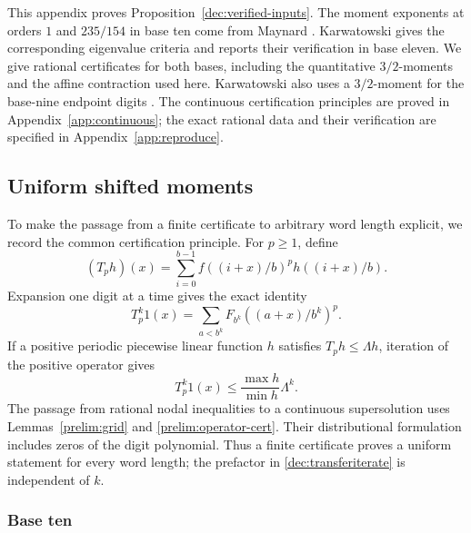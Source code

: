 \documentclass[11pt,a4paper]{article}
\theoremstyle{paperplain}
\numberwithin{equation}{section}
\begin{document}
This appendix proves Proposition~\ref{dec:verified-inputs}.
The moment exponents at orders $1$ and $235/154$ in base ten come
from Maynard \cite[Lemmas~10.3--10.4]{Maynard2019}. Karwatowski
\cite[Sections~3 and~5]{Karwatowski2022} gives the corresponding
eigenvalue criteria and reports their verification in base eleven. We give rational certificates for both bases, including
the quantitative $3/2$-moments and the affine contraction used here.
Karwatowski also uses a $3/2$-moment for the base-nine endpoint digits
\cite[Section~3, p.~5]{KarwatowskiBaseNine}. The continuous
certification principles are proved in Appendix~\ref{app:continuous};
the exact rational data and their verification are specified in
Appendix~\ref{app:reproduce}.

\subsection{Uniform shifted moments}

To make the passage from a finite certificate to arbitrary word length explicit,
we record the common certification principle. For $p\ge1$, define
\[
 (T_ph)(x)=\sum_{i=0}^{b-1}f((i+x)/b)^p h((i+x)/b).
\]
Expansion one digit at a time gives the exact identity
\[
 T_p^k1(x)=\sum_{a<b^k}F_{b^k}((a+x)/b^k)^p.
\]
If a positive periodic piecewise linear function $h$ satisfies
$T_ph\le\Lambda h$, iteration of the positive operator gives
\begin{equation}\label{dec:transferiterate}
 T_p^k1(x)\le \frac{\max h}{\min h}\Lambda^k.
\end{equation}
The passage from rational nodal inequalities to a continuous supersolution
uses Lemmas~\ref{prelim:grid} and \ref{prelim:operator-cert}.
Their distributional formulation includes zeros of the digit polynomial.
Thus a finite certificate proves a uniform statement for every word length;
the prefactor in \eqref{dec:transferiterate} is independent of $k$.

\subsubsection{Base ten}
\end{document}
